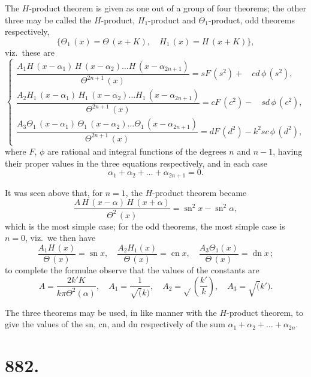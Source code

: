 \documentclass[11pt,a4paper]{article}
\theoremstyle{plain}
\theoremstyle{definition}
\begin{document}
The $H$-product theorem is given as one out of a group of four theorems; the other three may be called the $H$-product, $H_1$-product and $\Theta_1$-product, odd theorems respectively,
\[ \{\Theta_1\,(x) = \Theta\,(x+K),\quad H_1\,(x) = H\,(x+K)\}, \]
viz.\ these are
\[
\begin{cases}
\dfrac{A_1 H\,(x-\alpha_1)\, H\,(x-\alpha_2) \ldots H\,(x-\alpha_{2n+1})}{\Theta^{2n+1}\,(x)} = sF\,(s^2) + \phantom{k^2} cd\, \phi\, (s^2), \\[8pt]
\dfrac{A_2 H_1\,(x-\alpha_1)\, H_1\,(x-\alpha_2) \ldots H_1\,(x-\alpha_{2n+1})}{\Theta^{2n+1}\,(x)} = cF\,(c^2) - \phantom{k^2} sd\, \phi\, (c^2), \\[8pt]
\dfrac{A_3 \Theta_1\,(x-\alpha_1)\, \Theta_1\,(x-\alpha_2) \ldots \Theta_1\,(x-\alpha_{2n+1})}{\Theta^{2n+1}\,(x)} = dF\,(d^2) - k^2 sc\, \phi\, (d^2),
\end{cases}
\]
where $F$, $\phi$ are rational and integral functions of the degrees $n$ and $n-1$, having their proper values in the three equations respectively, and in each case
\[ \alpha_1 + \alpha_2 + \ldots + \alpha_{2n+1} = 0. \]

It was seen above that, for $n=1$, the $H$-product theorem became
\[ \frac{A\, H\,(x-\alpha)\, H\,(x+\alpha)}{\Theta^2\,(x)} = \operatorname{sn}^2 x - \operatorname{sn}^2 \alpha, \]
which is the most simple case; for the odd theorems, the most simple case is $n=0$, viz.\ we then have
\[ \frac{A_1 H\,(x)}{\Theta\,(x)} = \operatorname{sn} x,\quad \frac{A_2 H_1(x)}{\Theta\,(x)} = \operatorname{cn} x,\quad \frac{A_3 \Theta_1(x)}{\Theta\,(x)} = \operatorname{dn} x\,; \]
to complete the formulae observe that the values of the constants are
\[ A = \frac{2k'K}{k\pi \Theta^2(\alpha)},\quad A_1 = \frac{1}{\surd(k)},\quad A_2 = \surd\!\left(\frac{k'}{k}\right),\quad A_3 = \surd(k'). \]

The three theorems may be used, in like manner with the $H$-product theorem, to give the values of the sn, cn, and dn respectively of the sum $\alpha_1 + \alpha_2 + \ldots + \alpha_{2n}$.


\newpage
\section*{882.}
\end{document}
